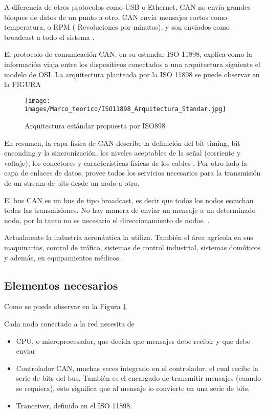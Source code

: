 A diferencia de otros protocolos como USB o Ethernet, CAN no envía grandes bloques de datos de un punto a otro. CAN envía mensajes cortos como temperatura, o RPM ( Revoluciones por minutos), y son enviados como broadcast a todo el sistema \citep{texasCAN}.

El protocolo de comunicación CAN, en su estandar ISO 11898, explica como la información viaja entre los dispositivos conectados a una arquitectura siguiente el modelo de OSI. La arquitectura planteada por la ISO 11898 se puede observar en la FIGURA \citep{texasCAN}

\begin{figure}[h]
 \centering
 \texttt{[image: images/Marco\_teorico/ISO11898\_Arquitectura\_Standar.jpg]}
  \caption{Arquitectura estándar propuesta por ISO898}
\label{fig:iso11898}
\end{figure}

En resumen, la capa física de CAN  describe la definición del bit timing, bit enconding y la sincronización, los niveles aceptables de la señal (corriente y voltaje), los conectores y características físicas de los cables \citep{texasCAN}. Por otro lado la capa de enlaces de datos, provee todos los servicios necesarios para la transmisión de un stream de bits desde un nodo a otro.

El bus CAN es un bus de tipo broadcast, es decir que todos los nodos escuchan todas las transmisiones. No hay manera de enviar un mensaje a un determinado nodo, por lo tanto no es necesario el direccionamiento de nodos. \citep{kvaserWEB}.

Actualmente la industria aeronáutica la utiliza. También el área agrícola en sus maquinarias, control de tráfico, sistemas de control industrial, sistemas domóticos y además, en equipamientos médicos.

\subsection{Elementos necesarios}
Como se puede observar en la Figura \ref{fig:iso11898}

Cada nodo conectado a la red necesita de
\begin{itemize}
\item \ac{CPU}, o microprocesador, que decida que mensajes debe recibir y que debe enviar
\item Controlador CAN, muchas veces integrado en el controlador, el cual recibe la serie de bits del bus. También es el encargado de transmitir mensajes (cuando se requiera), esto significa que al mensaje lo convierte en una serie de bits.
  \item Tranceiver, definido en el ISO 11898.
\end{itemize}


